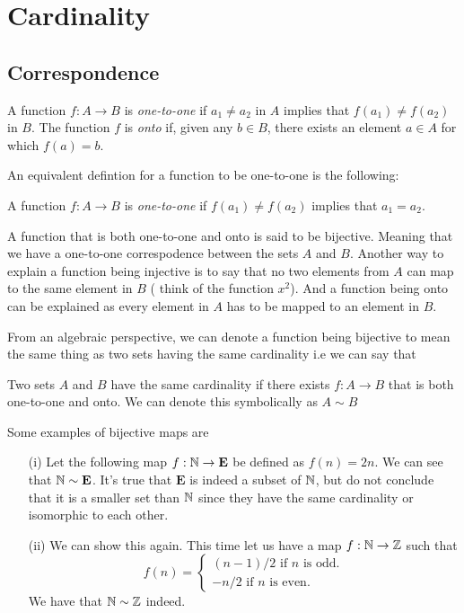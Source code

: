 


\section{Cardinality}

\subsection{Correspondence}

\begin{definition}
    A function \( f: A \to B \) is \textit{one-to-one} if \( a_1 \neq a_2 \) in \( A \) implies that 
    \( f(a_1) \neq f(a_2) \) in \( B \). The function \( f \) is \textit{onto} if, given any \( b \in B \), there exists an element \( a \in A \) for which \( f(a) = b\).
\end{definition}

An equivalent defintion for a function to be one-to-one is the following:

\begin{definition}
    A function \( f: A \to B \) is \textit{one-to-one} if \( f(a_1) \neq f(a_2) \) implies that \( a_1 = a_2 \).
\end{definition}
    
A function that is both one-to-one and onto is said to be bijective. Meaning that we have a one-to-one correspodence between the sets \( A \) and \( B \). Another way to explain a function being injective is to say that no two elements from \( A \) can map to the same element in \( B \) ( think of the function \( x^2\)). And a function being onto can be explained as every element in \( A \) has to be mapped to an element in \( B \).

From an algebraic perspective, we can denote a function being bijective to mean the same thing as two sets having the same cardinality i.e we can say that 

\begin{definition}
Two sets \( A \) and \( B \) have the same cardinality if there exists \( f: A \to B \) that is both one-to-one and onto. We can denote this symbolically as \( A \sim B\)
\end{definition}

Some examples of bijective maps are
\begin{enumerate}
    \item[(i)] Let the following map \(f: \mathbb{N} \to \mathbf{E} \) be defined as \( f(n) = 2n \). We can see that \( \mathbb{N} \sim \mathbf{E}\). It's true that \( \mathbf{E}\) is indeed a subset of \( \mathbb{N} \), but do not conclude that it is a smaller set than \( \mathbb{N} \) since they have the same cardinality or isomorphic to each other.
    \item[(ii)] We can show this again. This time let us have a map \( f: \mathbb{N} \to \mathbb{Z} \) such that 
        \[ f(n) = \begin{cases}  (n-1)/2 \text{ if } n \text{ is odd.}       \\
                                 -n/2 \text{ if } n \text{ is even.}
                                                \end{cases}\]
We have that \( \mathbb{N} \sim \mathbb{Z} \) indeed.
\end{enumerate}


